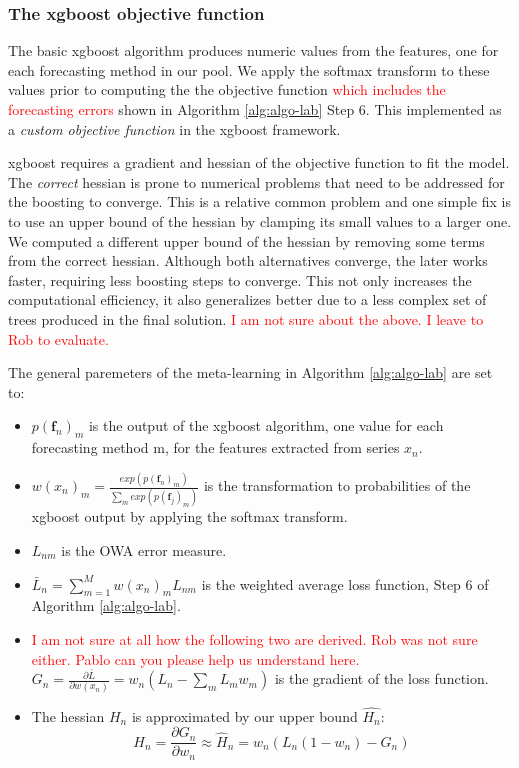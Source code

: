 \documentclass[11pt,a4paper,]{article}
\providecommand{\tightlist}{%
  \setlength{\itemsep}{0pt}\setlength{\parskip}{0pt}}
\theoremstyle{definition}
\theoremstyle{definition}
\theoremstyle{definition}
\theoremstyle{remark}
\begin{document}
\subsubsection{The xgboost objective
function}\label{the-xgboost-objective-function}

The basic xgboost algorithm produces numeric values from the features,
one for each forecasting method in our pool. We apply the softmax
transform to these values prior to computing the the objective function
\textcolor{red}{which includes the forecasting errors} shown in
Algorithm \ref{alg:algo-lab} Step 6. This implemented as a \emph{custom
objective function} in the xgboost framework.

xgboost requires a gradient and hessian of the objective function to fit
the model. The \emph{correct} hessian is prone to numerical problems
that need to be addressed for the boosting to converge. This is a
relative common problem and one simple fix is to use an upper bound of
the hessian by clamping its small values to a larger one. We computed a
different upper bound of the hessian by removing some terms from the
correct hessian. Although both alternatives converge, the later works
faster, requiring less boosting steps to converge. This not only
increases the computational efficiency, it also generalizes better due
to a less complex set of trees produced in the final solution.
\textcolor{red}{I am not sure about the above. I leave to Rob to evaluate.}

The general paremeters of the meta-learning in Algorithm
\ref{alg:algo-lab} are set to:

\begin{itemize}
\tightlist
\item
  \(p(\bm{f}_n)_m\) is the output of the xgboost algorithm, one value
  for each forecasting method m, for the features extracted from series
  \(x_n\).
\item
  \(w(x_n)_{m} = \frac{exp(p(\bm{f}_n)_m)}{ \sum_m exp(p(\bm{f}_j)_m)}\)
  is the transformation to probabilities of the xgboost output by
  applying the softmax transform.
\item
  \(L_{nm}\) is the OWA error measure.
\item
  \(\bar{L}_n = \sum_{m=1}^M w(x_n)_m L_{nm}\) is the weighted average
  loss function, Step 6 of Algorithm \ref{alg:algo-lab}.
\item
  \textcolor{red}{I am not sure at all how the following two are derived. Rob was not sure either. Pablo can you please help us understand here.}
  \(G_n = \frac{\partial{\bar{L}}}{\partial{w(x_n)}} = w_n(L_n -\sum_m L_mw_m)\)
  is the gradient of the loss function.
\item
  The hessian \(H_n\) is approximated by our upper bound \(\hat{H_n}\):
  \[ H_n = \frac{\partial{G_n}}{\partial{w_n}} \approx \hat{H}_n = w_n(L_n(1-w_n) - G_n)  \]
\end{itemize}
\end{document}
